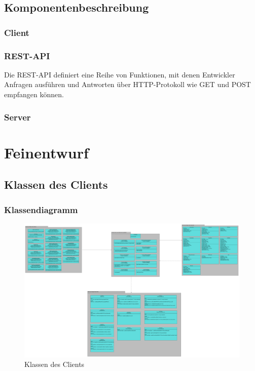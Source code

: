 \documentclass[a4paper]{scrreprt}
\begin{document}
      \newpage
	 
	 \section{Komponentenbeschreibung}
		 \subsection{Client}
	 		
	 		
	 	 \subsection{REST-API}
	 	 	Die REST-API definiert eine Reihe von Funktionen, mit denen Entwickler Anfragen ausführen und Antworten über HTTP-Protokoll wie GET und POST empfangen können.
	 	 	
	  \newpage
		
		 \subsection{Server}
	 	 	
	 	 
        
\newpage

\chapter{Feinentwurf}
	\section{Klassen des Clients}
	\subsection{Klassendiagramm}
	\begin{figure}[H]
	       \centering
	       \includegraphics[scale = .07]{all_client_packages.png}
	       \caption{Klassen des Clients}
	      \end{figure}
	
\end{document}
